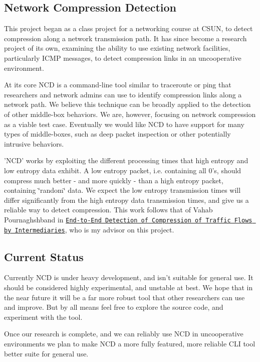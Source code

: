 \subsection*{Network Compression Detection }

This project began as a class project for a networking course at C\-S\-U\-N, to detect compression along a network transmission path. It has since become a research project of its own, examining the ability to use existing network facilities, particularly I\-C\-M\-P messages, to detect compression links in an uncooperative environment.

At its core {\ttfamily N\-C\-D} is a command-\/line tool similar to {\ttfamily traceroute} or {\ttfamily ping} that researchers and network admins can use to identify compression links along a network path. We believe this technique can be broadly applied to the detection of other middle-\/box behaviors. We are, however, focusing on network compression as a viable test case. Eventually we would like N\-C\-D to have support for many types of middle-\/boxes, such as deep packet inspection or other potentially intrusive behaviors.

'N\-C\-D' works by exploiting the different processing times that high entropy and low entropy data exhibit. A low entropy packet, i.\-e. containing all 0's, should compress much better -\/ and more quickly -\/ than a high entropy packet, containing \char`\"{}random\char`\"{} data. We expect the low entropy transmission times will differ significantly from the high entropy data transmission times, and give us a reliable way to detect compression. This work follows that of Vahab Pournaghshband in \href{http://lasr.cs.ucla.edu/vahab/resources/compression_detection.pdf}{\tt End-\/to-\/\-End Detection of Compression of Traffic Flows by Intermediaries}, who is my advisor on this project.

\subsection*{Current Status }

Currently {\ttfamily N\-C\-D} is under heavy development, and isn't suitable for general use. It should be considered highly experimental, and unstable at best. We hope that in the near future it will be a far more robust tool that other researchers can use and improve. But by all means feel free to explore the source code, and experiment with the tool.

Once our research is complete, and we can reliably use {\ttfamily N\-C\-D} in uncooperative environments we plan to make {\ttfamily N\-C\-D} a more fully featured, more reliable C\-L\-I tool better suite for general use. 